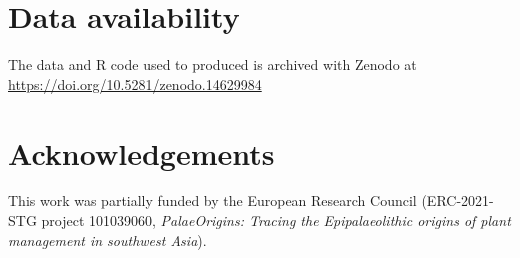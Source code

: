 \documentclass[
  authoryear,
  preprint]{elsarticle}
\begin{document}
\section{Data availability}\label{data-availability}

The data and R code used to produced is archived with Zenodo at
\url{https://doi.org/10.5281/zenodo.14629984}

\section{Acknowledgements}\label{acknowledgements}

This work was partially funded by the European Research Council
(ERC-2021-STG project 101039060, \emph{PalaeOrigins: Tracing the
Epipalaeolithic origins of plant management in southwest Asia}).


\renewcommand\refname{References}
  
\end{document}
